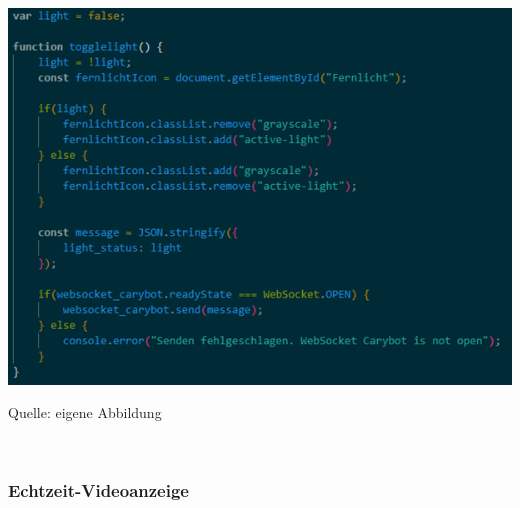 \documentclass[ngerman,12pt,a4paper]{article}
\begin{document}
	\begin{center}
		\begin{minipage}[t]{0.95\textwidth}
			\includegraphics[scale=0.9]{Pictures/fernlicht-js}
			\label{fig:fernlicht-js}
			\vspace{-10pt}
			\begin{center}
				\par\small Quelle: eigene Abbildung 
			\end{center}
		\end{minipage} \\[0.75cm]
	\end{center}

			\subsubsection{Echtzeit-Videoanzeige}
			
\end{document}
